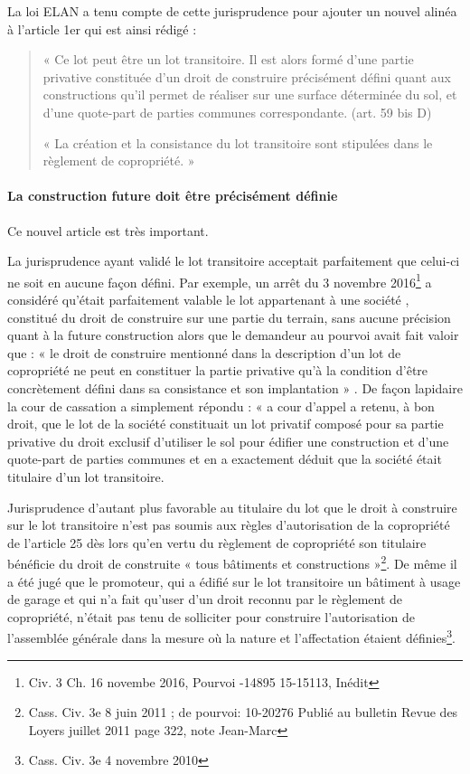 				La loi ELAN a tenu compte de cette jurisprudence pour ajouter un nouvel alinéa à l’article 1er qui est ainsi rédigé :
				\begin{quote}
					« Ce lot peut être un lot transitoire. Il est alors formé d’une partie privative constituée d’un droit de construire précisément défini quant aux constructions qu’il permet de réaliser sur une surface déterminée du sol, et d’une quote-part de parties communes correspondante. (art. 59 bis D)
					
					« La création et la consistance du lot transitoire sont stipulées dans le règlement de copropriété. »
				\end{quote}
			
			\paragraph{La construction future doit être précisément définie}
	
				Ce nouvel article est très important.
				
				La jurisprudence ayant validé le lot transitoire acceptait parfaitement que celui-ci ne soit en aucune façon défini. Par exemple, un arrêt du 3 novembre 2016\footnote{Civ. 3\degre{} Ch. 16 novembe 2016, Pourvoi -14895 15-15113, Inédit} a considéré qu’était parfaitement valable le lot appartenant à une société , constitué du droit de construire sur une partie du terrain, sans aucune précision quant à la future construction alors que le demandeur au pourvoi avait fait valoir que : « le droit de construire mentionné dans la description d'un lot de copropriété ne peut en constituer la partie privative qu'à la condition d'être concrètement défini dans sa consistance et son implantation » . De façon lapidaire la cour de cassation a simplement répondu : « a cour d'appel a retenu, à bon droit, que le lot de la société constituait un lot privatif composé pour sa partie privative du droit exclusif d'utiliser le sol pour édifier une construction et d'une quote-part de parties communes et en a exactement déduit que la société était titulaire d'un lot transitoire.
				
				Jurisprudence d’autant plus favorable au titulaire du lot que le droit à construire sur le lot transitoire n'est pas soumis aux règles d'autorisation de la copropriété de l’article 25 dès lors qu'en vertu du règlement de copropriété son titulaire bénéficie du droit de construite « tous bâtiments et constructions »\footnote{Cass. Civ. 3e 8 juin 2011 ; \no de pourvoi: 10-20276 Publié au bulletin Revue des Loyers juillet 2011 page 322, note Jean-Marc }. De même il a été jugé que le promoteur, qui a édifié sur le lot transitoire un bâtiment à usage de garage et qui n'a fait qu'user d'un droit reconnu par le règlement de copropriété, n'était pas tenu de solliciter pour construire l'autorisation de l'assemblée générale dans la mesure où la nature et l’affectation étaient définies\footnote{Cass. Civ. 3e 4 novembre 2010}.
				
